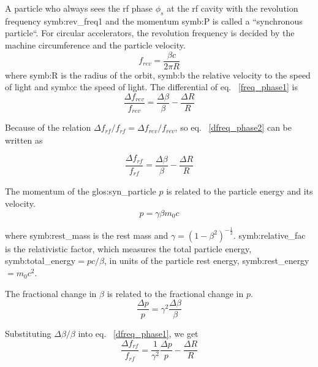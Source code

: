 A particle who always sees the rf phase $\phi_\mathit{s}$ at the rf cavity with the revolution frequency \gls{symb:rev_freq1} and the momentum \gls{symb:P} is called a ``synchronous particle``. For circular accelerators, the revolution frequency is decided by the machine circumference and the particle velocity.
\begin{equation}
f_{\mathit{rev}}=\frac{\beta c}{2\pi R} \label{freq_phase1}
\end{equation}
where \gls{symb:R} is the radius of the orbit, \gls{symb:b} the relative velocity to the speed of light and \gls{symb:c} the speed of light. The differential of eq. ~\ref{freq_phase1} is
\begin{equation}
\frac{\Delta f_{\mathit{rev}}}{f_{\mathit{rev}}}=\frac{\Delta\beta}{\beta}-\frac{\Delta R}{R} \label{dfreq_phase2}
\end{equation}

Because of the relation $\Delta f_{\mathit{rf}}/f_{\mathit{rf}}=\Delta f_{\mathit{rev}}/f_{\mathit{rev}}$, so eq.~ \ref{dfreq_phase2} can be written as

\begin{equation}
\frac{\Delta f_{\mathit{rf}}}{f_{\mathit{rf}}}=\frac{\Delta\beta}{\beta}-\frac{\Delta R}{R} \label{dfreq_phase1}
\end{equation}

The momentum of the \gls{glos:syn_particle} $p$ is related to the particle energy and its velocity.  
\begin{equation}
p=\gamma \beta m_0c
\end{equation}

where \gls{symb:rest_mass} is the rest mass and $\gamma=(1-\beta^2)^{-\frac{1}{2}}$. \gls{symb:relative_fac} is the relativistic factor, which measures the total particle energy, \gls{symb:total_energy}$=pc/\beta$, in units of the particle rest energy, \gls{symb:rest_energy}$=m_0c^2$. 


The fractional change in $\beta$ is related to the fractional change in $p$.
\begin{equation}
\label{eq:pv}
\frac{\Delta p}{p}=\gamma^2\frac{\Delta \beta}{\beta}
\end{equation}

Substituting $\Delta \beta/\beta$ into eq. ~\ref{dfreq_phase1}, we get 
\begin{equation}
\frac{\Delta f_{\mathit{rf}}}{f_{\mathit{rf}}}=\frac{1}{\gamma^2}\frac{\Delta p}{p}-\frac{\Delta R}{R}\label{f_p_r1}
\end{equation} 

